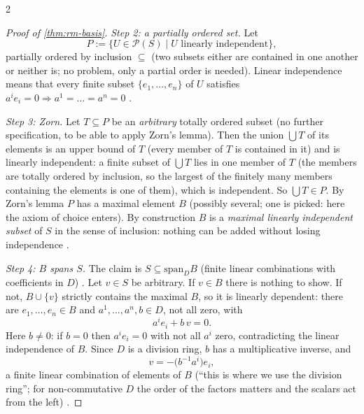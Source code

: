 \begin{paracol}{2}
\begin{proof}[Proof of \cref{thm:rm-basis}]
\emph{Step 2: a partially ordered set.} Let
\[
  P:=\{U\in\mathcal P(S)\mid U\text{ linearly independent}\},
\]
partially ordered by inclusion $\subseteq$ (two subsets either are contained in one another or neither is; no problem, only a partial order is needed). Linear independence means that every finite subset $\{e_1,\dots,e_n\}$ of $U$ satisfies $a^ie_i=0\Rightarrow a^1=\dots=a^n=0$       .

\emph{Step 3: Zorn.} Let $T\subseteq P$ be an \emph{arbitrary} totally ordered subset (no further specification, to be able to apply Zorn's lemma). Then the union $\bigcup T$ of its elements is an upper bound of $T$ (every member of $T$ is contained in it) and is linearly independent: a finite subset of $\bigcup T$ lies in one member of $T$ (the members are totally
ordered by inclusion, so the largest of the finitely many members containing the elements is one of them), which is independent. So $\bigcup T\in P$. By Zorn's lemma $P$ has a maximal element $B$ (possibly several; one is picked: here the axiom of choice enters). By construction $B$ is a \emph{maximal linearly independent subset} of $S$ in the sense of inclusion: nothing can be
added without losing independence              .

\emph{Step 4: $B$ spans $S$.} The claim is $S\subseteq\mathrm{span}_DB$ (finite linear combinations with coefficients in $D$)   . Let $v\in S$ be arbitrary. If $v\in B$ there is nothing to show. If not, $B\cup\{v\}$ strictly contains the maximal $B$, so it is linearly dependent: there are
$e_1,\dots,e_n\in B$ and $a^1,\dots,a^n,b\in D$, not all zero, with
\[
  a^ie_i+b\,v=0.
\]
Here $b\ne0$: if $b=0$ then $a^ie_i=0$ with not all $a^i$ zero, contradicting the linear independence of $B$. Since $D$ is a division ring, $b$ has a multiplicative inverse, and
\[
  v=-\bigl(b^{-1}a^i\bigr)e_i,
\]
a finite linear combination of elements of $B$ (``this is where we use the division ring''; for non-commutative $D$ the order of the factors matters and the scalars act from the left)                     .


\end{proof}
\end{paracol}
